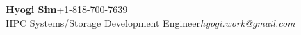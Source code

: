 {\textbf{\Large Hyogi Sim}\hfill{\small +1-818-700-7639}}\\
{\small
{HPC Systems/Storage Development Engineer}\hfill{\emph{\small hyogi.work@gmail.com}}\\
}
